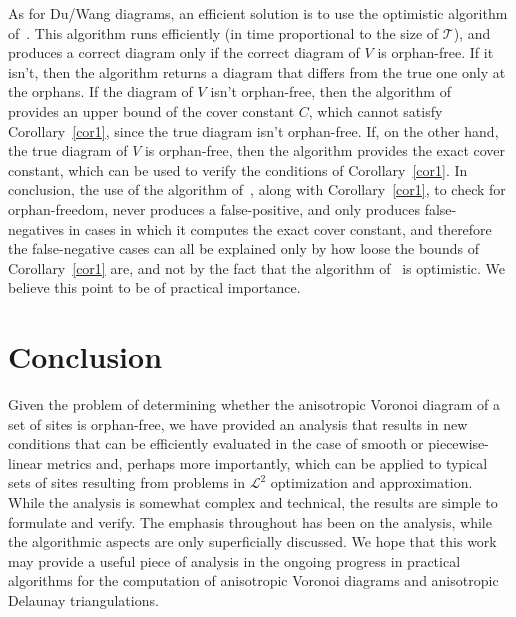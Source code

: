 \documentclass[11pt]{article}
\newcommand{\T}{\mathcal{T}}
\begin{document}
As for Du/Wang diagrams, an efficient solution is to use the optimistic algorithm of~\cite{adt}. This algorithm runs efficiently (in time proportional to the size of $\T$), 
and produces a correct diagram only if the correct diagram of $V$ is orphan-free. If it isn't, then the algorithm returns a diagram that differs from the true one only at the orphans. 
If the diagram of $V$ isn't orphan-free, then the algorithm of~\cite{adt} provides an upper bound of the cover constant $C$, which cannot satisfy Corollary~\ref{cor1}, since the true diagram isn't orphan-free. If, on the other hand, the true diagram of $V$ is orphan-free, then the algorithm provides the exact cover constant, which can be used to verify the conditions of Corollary~\ref{cor1}. 
In conclusion, the use of the algorithm of~\cite{adt}, along with Corollary~\ref{cor1}, to check for orphan-freedom, never produces a false-positive, 
and only produces false-negatives in cases in which it computes the exact cover constant, and therefore the false-negative cases can all be explained only by how loose the bounds of Corollary~\ref{cor1} are, and not by the fact that the algorithm of~\cite{adt} is optimistic. We believe this point to be of practical importance. 

\section{Conclusion}

Given the problem of determining whether the anisotropic Voronoi diagram of a set of sites is orphan-free, 
we have provided an analysis that results in new conditions that can be efficiently evaluated in the case of smooth or piecewise-linear metrics and, 
perhaps more importantly, which can be applied to typical sets of sites resulting from problems in $\mathcal{L}^2$ optimization and approximation. 
While the analysis is somewhat complex and technical, the results are simple to formulate and verify. 
The emphasis throughout has been on the analysis, while the algorithmic aspects are only superficially discussed. 
We hope that this work may provide a useful piece of analysis in the ongoing progress in practical algorithms for the computation of anisotropic Voronoi diagrams and anisotropic Delaunay triangulations. 
\end{document}
